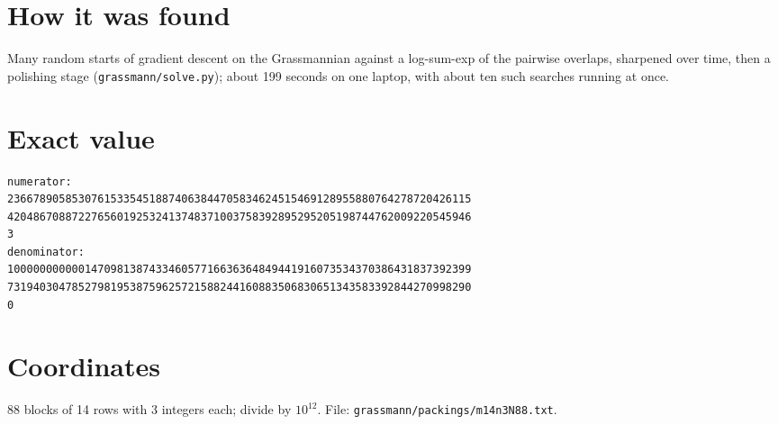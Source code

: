 \documentclass[11pt,a4paper]{article}
\begin{document}
\section{How it was found}
Many random starts of gradient descent on the Grassmannian against a log-sum-exp of the pairwise overlaps, sharpened over time, then a polishing stage (\texttt{grassmann/solve.py}); about 199 seconds on one laptop, with about ten such searches running at once.


\appendix
\section{Exact value}
{\small
\begin{verbatim}
numerator:
236678905853076153354518874063844705834624515469128955880764278720426115
420486708872276560192532413748371003758392895295205198744762009220545946
3
denominator:
100000000000147098138743346057716636364849441916073534370386431837392399
731940304785279819538759625721588244160883506830651343583392844270998290
0
\end{verbatim}}

\section{Coordinates}
88 blocks of 14 rows with 3 integers each; divide by $10^{12}$. File: \texttt{grassmann/packings/m14n3N88.txt}.
{\tiny
\begin{multicols}{3}
\end{multicols}}
\end{document}
